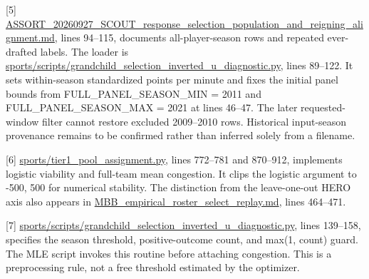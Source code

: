 {[}5{]} \href{file:////Users/charleslevine/Library/CloudStorage/Dropbox/1-Documents/00-\%20Dissertation/0-Next_Chapter/Code_and_Data/New\%20SQL\%20and\%20PY\%20Code/Cursor\%20Workspace\%20PDE/3-Master_Plan/VECTOR_work/new_VECTOR_work/assort_analysis/docs/source_review/ASSORT_20260927_SCOUT_response_selection_population_and_reigning_alignment.md}{ASSORT\_\allowbreak{}20260927\_\allowbreak{}SCOUT\_\allowbreak{}response\_\allowbreak{}selection\_\allowbreak{}population\_\allowbreak{}and\_\allowbreak{}reigning\_\allowbreak{}alignment.md}, lines 94--115, documents all-player-season rows and repeated ever-drafted labels. The loader is \href{file:///Users/charleslevine/Library/CloudStorage/Dropbox/1-Documents/00-\%20Dissertation/0-Next_Chapter/Code_and_Data/New\%20SQL\%20and\%20PY\%20Code/Cursor\%20Workspace\%20PDE/sports/scripts/grandchild_selection_inverted_u_diagnostic.py}{sports/scripts/grandchild\_\allowbreak{}selection\_\allowbreak{}inverted\_\allowbreak{}u\_\allowbreak{}diagnostic.py}, lines 89--122. It sets within-season standardized points per minute and fixes the initial panel bounds from FULL\_\allowbreak{}PANEL\_\allowbreak{}SEASON\_\allowbreak{}MIN = 2011 and FULL\_\allowbreak{}PANEL\_\allowbreak{}SEASON\_\allowbreak{}MAX = 2021 at lines 46--47. The later requested-window filter cannot restore excluded 2009--2010 rows. Historical input-season provenance remains to be confirmed rather than inferred solely from a filename.

{[}6{]} \href{file:///Users/charleslevine/Library/CloudStorage/Dropbox/1-Documents/00-\%20Dissertation/0-Next_Chapter/Code_and_Data/New\%20SQL\%20and\%20PY\%20Code/Cursor\%20Workspace\%20PDE/sports/tier1_pool_assignment.py}{sports/tier1\_\allowbreak{}pool\_\allowbreak{}assignment.py}, lines 772--781 and 870--912, implements logistic viability and full-team mean congestion. It clips the logistic argument to -500, 500 for numerical stability. The distinction from the leave-one-out HERO axis also appears in \href{file:///Users/charleslevine/Library/CloudStorage/Dropbox/1-Documents/00-\%20Dissertation/0-Next_Chapter/Code_and_Data/New\%20SQL\%20and\%20PY\%20Code/Cursor\%20Workspace\%20PDE/3-Master_Plan/re_entry/HEROs_and_PASSes/MBB_empirical_roster_select_replay.md}{MBB\_\allowbreak{}empirical\_\allowbreak{}roster\_\allowbreak{}select\_\allowbreak{}replay.md}, lines 464--471.

{[}7{]} \href{file:///Users/charleslevine/Library/CloudStorage/Dropbox/1-Documents/00-\%20Dissertation/0-Next_Chapter/Code_and_Data/New\%20SQL\%20and\%20PY\%20Code/Cursor\%20Workspace\%20PDE/sports/scripts/grandchild_selection_inverted_u_diagnostic.py}{sports/scripts/grandchild\_\allowbreak{}selection\_\allowbreak{}inverted\_\allowbreak{}u\_\allowbreak{}diagnostic.py}, lines 139--158, specifies the season threshold, positive-outcome count, and max(1, count) guard. The MLE script invokes this routine before attaching congestion. This is a preprocessing rule, not a free threshold estimated by the optimizer.

